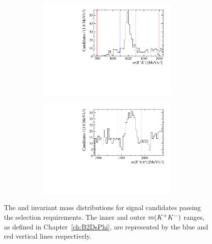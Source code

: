 \begin{figure}[!h]
\begin{subfigure}[t]{1.0\textwidth}
\begin{subfigure}[t]{0.35\textwidth}
        \includegraphics[width=1.0\textwidth]{figs/Selection/Phimass_KPiPi_B2DsPhi.pdf}
     \end{subfigure}
     \begin{subfigure}[t]{0.35\textwidth}
        \centering
        \includegraphics[width=1.0\textwidth]{figs/Selection/Dmass_KPiPi_B2DsPhi.pdf}
     \end{subfigure}
     \caption{\decay{\Dsp}{\Kp\pim\pip}}
   \end{subfigure}
   \caption{The \Dsp and \phiz invariant mass distributions for signal \decay{\Bp}{\Dsp\phiz} candidates passing the selection requirements. The inner and outer $m({{K}^+}{{K}^-})$ ranges, as defined in Chapter~\ref{ch:B2DsPhi}, are represented by the blue and red vertical lines respectively.}
   \label{fig:d_phi_mass_signal}   
\end{figure}
